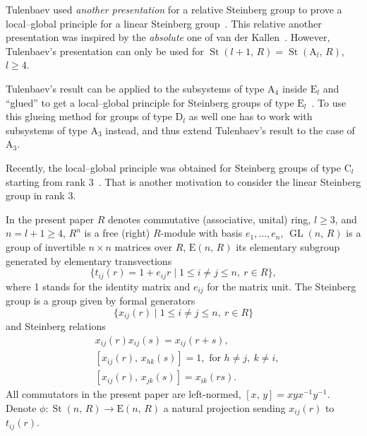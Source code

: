 \documentclass[11pt]{amsart}
\theoremstyle{plain} \declaretheorem[name=Theorem, Refname={Theorem,Theorems}]{tm} \Crefname{tm}{Theorem}{Theorems}
\numberwithin{equation}{section}
\theoremstyle{definition} \newtheorem{df}[lm]{Definition} \Crefname{df}{Definition}{Definitions}
\theoremstyle{remark} \newtheorem{rk}[lm]{Remark} \Crefname{rk}{Remark}{Remarks}
\newcommand{\E}{{\mathrm{E}}}
\newcommand{\St}{\mathop{\mathrm{St}}\nolimits}
\newcommand{\GL}{\mathop{\mathrm{GL}}\nolimits}
\newcommand{\inv}{^{-1}}
\begin{document}
Tulenbaev used {\it another presentation} for a relative Steinberg group to prove a local--global principle for a linear Steinberg group~\cite{Tul}. 
This relative another presentation was inspired by the {\it absolute} one of van der Kallen~\cite{vdK}. 
However, Tulenbaev's presentation can only be used for $\St(l+1,\,R)=\St(\mathrm A_l,\,R)$, $l\geq4$.

Tulenbaev's result can be applied to the subsystems of type $\mathrm A_4$ inside $\mathrm E_l$ and ``glued'' to get a local--global principle for Steinberg groups of type $\mathrm E_l$~\cite{SCh}. 
To use this glueing method for groups of type $\mathrm D_l$ as well one has to work with subsystems of type $\mathrm A_3$ instead, and thus extend Tulenbaev's result to the case of $\mathrm A_3$.

Recently, the local--global principle was obtained for Steinberg groups of type $\mathrm C_l$ starting from rank 3~\cite{Lav2}. 
That is another motivation to consider the linear Steinberg group in rank 3.

In the present paper $R$ denotes commutative (associative, unital) ring, $l\geq3$, and $n=l+1\geq4$, $R^n$ is a free (right) $R$-module with basis $e_1,\ldots,e_n$, 
$\GL(n,\,R)$ is a group of invertible $n\times n$ matrices over $R$, $\E(n,\,R)$ its elementary subgroup generated by elementary transvections 
$$\{t_{ij}(r)=1+e_{ij}r\mid1\leq i\neq j\leq n,\ r\in R\},$$
where 1 stands for the identity matrix and $e_{ij}$ for the matrix unit. The Steinberg group is a group given by formal generators
$$\{x_{ij}(r)\mid1\leq i\neq j\leq n,\ r\in R\}$$
and Steinberg relations
\setcounter{equation}{0}
\renewcommand{\theequation}{S\arabic{equation}}
\begin{align}
&x_{ij}(r)x_{ij}(s)=x_{ij}(r+s),\\
&[x_{ij}(r),\,x_{hk}(s)]=1,\text{ for }h\neq j,\ k\neq i,\\
&[x_{ij}(r),\,x_{jk}(s)]=x_{ik}(rs).
\end{align}
All commutators in the present paper are left-normed, $[x,\,y]=xyx\inv y\inv$. 
Denote $\phi\colon\St(n,\,R)\rightarrow\E(n,\,R)$ a natural projection sending $x_{ij}(r)$ to $t_{ij}(r)$.
\end{document}
